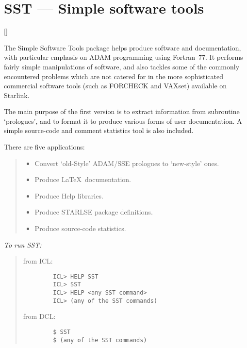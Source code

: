 \newpage

\section{SST --- Simple software tools}

\vspace{-11mm}

\hfill []

\vspace{5mm}

The Simple Software Tools package helps produce software and documentation,
with particular emphasis on ADAM programming using Fortran~77.
It performs fairly simple manipulations of software, and also tackles some of
the commonly encountered problems which are not catered for in the more
sophisticated commercial software tools (such as FORCHECK and VAXset)
available on Starlink.

The main purpose of the first version is to extract information from subroutine
`prologues', and to format it to produce various forms of user documentation.
A simple source-code and comment statistics tool is also included.

There are five applications:

{\small
\begin{quote}
\begin{itemize}
\item Convert `old-Style' ADAM/SSE prologues to `new-style' ones.
\item Produce \LaTeX\ documentation.
\item Produce Help libraries.
\item Produce STARLSE package definitions.
\item Produce source-code statistics.
\end{itemize}
\end{quote}
}

{\em To run SST:}\hfill
\begin{quote}
\begin{description}

\item [from ICL:]\hfill

\begin{small}
\begin{verbatim}
   ICL> HELP SST
   ICL> SST
   ICL> HELP <any SST command>
   ICL> (any of the SST commands)
\end{verbatim}
\end{small}

\item [from DCL:]\hfill

\begin{small}
\begin{verbatim}
   $ SST
   $ (any of the SST commands)
\end{verbatim}
\end{small}

\end{description}
\end{quote}

